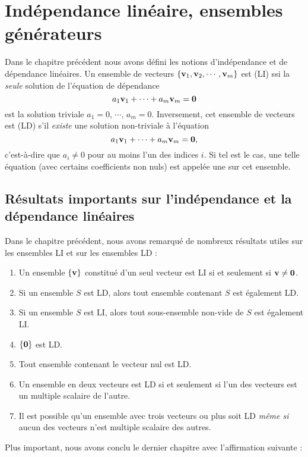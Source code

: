 \chapter{Ind\'ependance lin\'eaire, ensembles g\'en\'erateurs}

\label{chapter:Fr_08-independence_span}

Dans le chapitre pr\'ec\'edent nous avons défini les notions d'indépendance et de dépendance linéaires. 
Un ensemble de vecteurs $\{ \mathbf{v}_1, \mathbf{v}_2, \cdots, \mathbf{v}_m\}$ 
est  (LI) ssi la \emph{seule}
solution de l'équation de dépendance
$$
a_1\mathbf{v}_1+\cdots +a_m\mathbf{v}_m = \mathbf{0}
$$
est la solution triviale $a_1=0$, $\cdots$, $a_m=0$.  Inversement, 
cet ensemble de vecteurs est   (LD)
s'il \emph{existe} une solution non-triviale à l'\'equation 
$$
a_1\mathbf{v}_1+\cdots +a_m\mathbf{v}_m = \mathbf{0}, 
$$
c'est-à-dire que $a_i\neq0$ pour au moins l'un des indices $i$. Si tel est le cas, une telle équation (avec certains coefficients non nuls)
est appelée une  sur cet ensemble.

\section{Résultats importants sur l'indépendance et la dépendance linéaires}

Dans le chapitre précédent, nous avons remarqué de nombreux r\'esultats utiles sur les ensembles LI et sur les ensembles LD :
\begin{enumerate}
\item Un ensemble $\{ \mathbf{v}\}$ constitué d'un seul vecteur est LI si et seulement si $\mathbf{v} \neq \mathbf{0}$.
\item Si un ensemble $S$ est LD, alors tout ensemble contenant $S$ est également LD.
\item Si un ensemble $S$ est LI, alors tout sous-ensemble non-vide de $S$ est également LI.
\item $\{\mathbf{0}\}$ est LD.
\item Tout ensemble contenant le vecteur nul est LD. 
\item Un ensemble en deux vecteurs est LD si et seulement si l'un des vecteurs
est un multiple scalaire de l'autre.
\item Il est possible qu'un ensemble avec trois vecteurs ou plus soit LD \emph{même si} aucun des vecteurs n'est multiple scalaire des autres.
\end{enumerate}

Plus important, nous avons conclu le dernier chapitre avec l'affirmation suivante :

